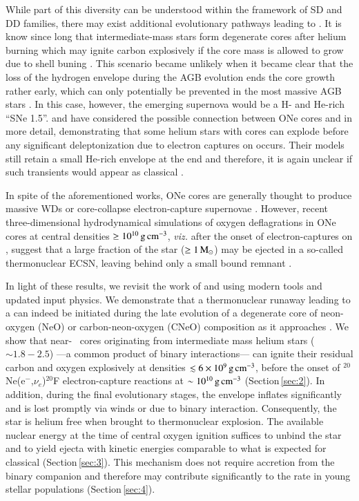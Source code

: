 \documentclass[twocolumn]{aa}
\begin{document}
While part of this diversity can be understood within the framework of SD and DD 
families, there may exist additional 
evolutionary pathways leading to \ias. 
It is know since long that intermediate-mass stars form
degenerate cores after helium burning which may ignite carbon
explosively if the core mass is allowed to grow due to shell buning
\citep{rose1969,Arnett:1969}. This scenario became unlikely
when it became clear that the loss of the hydrogen envelope during the
AGB evolution ends the core growth rather early, which can only
potentially be prevented in the most massive AGB stars \citep[see][and references therein]{Iben:1983ts}. 
In this case, however, the emerging supernova would be a H- and He-rich
“SNe 1.5”.
\cite{waldman2006a} and \cite{waldman2008} have considered the possible connection between ONe cores and \ias in more detail, 
demonstrating that some helium stars with \one cores can explode before any significant deleptonization due to electron captures on  occurs.
Their models  still retain a small He-rich envelope at the end and therefore, it is again unclear if such transients would appear as classical \ias. 

In spite of the aforementioned works, ONe cores are generally thought to produce massive WDs or core-collapse electron-capture supernovae \citep[ECSNe; e.g.,][]{nomoto1991,gutierrez1996,Takahashi:2013ena}. 
However, recent three-dimensional hydrodynamical 
simulations of oxygen deflagrations in ONe cores at 
central densities $\ge 10^{10}\mathrm{\,g\,cm^{-3}}$, {\it viz.} after the onset of electron-captures on , 
suggest that a large fraction of the star ($\ge 1\mathrm{\,M_\odot}$) may be 
ejected in a so-called thermonuclear ECSN, leaving 
behind only a small bound remnant \citep{Jones:2016asr,Jones:2018ule}.  

In light of these results, we revisit the work of \cite{waldman2006a} and \cite{waldman2008} using modern tools and updated input physics. We  demonstrate that a 
thermonuclear runaway leading to a \ia can indeed be initiated during the late evolution of a degenerate core of neon-oxygen 
(NeO) or carbon-neon-oxygen (CNeO) composition as it  approaches  \mch. We show that near-\mch~ \one cores originating from intermediate mass helium stars ($\sim 1.8-2.5$\msun) ---a common product of binary interactions--- can ignite their residual carbon and oxygen explosively at  
densities $\lesssim 6\times 10^{9}\mathrm{\,g\,cm^{-3}}$, 
before the onset of {\rm $^{20}$Ne(e$^-$,$\nu_e$)$^{20}$F} 
electron-capture reactions at $\sim 10^{10}\mathrm{\,g\,cm^{-3}}$ (Section\,\ref{sec:2}). 
In addition, during the final evolutionary stages, the envelope inflates significantly and is lost promptly  via winds or due to binary interaction. Consequently, the star is helium free when brought to thermonuclear explosion.   
The available nuclear energy at the time of central oxygen ignition suffices to unbind the star 
and to yield ejecta with kinetic energies comparable to what is expected for classical \ias (Section\,\ref{sec:3}).
 This mechanism  does not require accretion from the binary companion and 
 therefore may contribute significantly to the \ia  rate in young stellar populations (Section\,\ref{sec:4}). 
 
\end{document}
